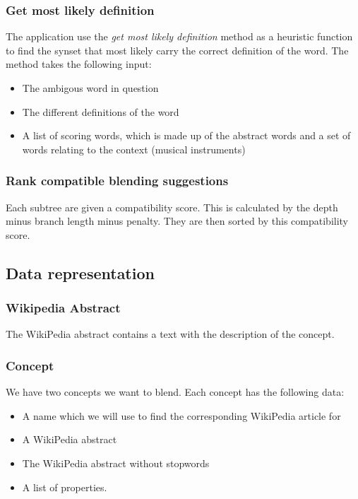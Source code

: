\subsubsection{Get most likely definition}
The application use the \emph{get most likely definition} method as a heuristic function to find the synset that most likely carry the correct definition of the word. The method takes the following input:
\begin{itemize}
	\item The ambigous word in question
	\item The different definitions of the word
	\item A list of scoring words, which is made up of the abstract words and a set of words relating to the context (musical instruments)
\end{itemize}

\subsubsection{Rank compatible blending suggestions}
Each subtree are given a compatibility score. This is calculated by the depth minus branch length minus penalty. They are then sorted by this compatibility score.

\subsection{Data representation}

\subsubsection{Wikipedia Abstract}
The WikiPedia abstract contains a text with the description of the concept.

\subsubsection{Concept}
We have two concepts we want to blend. Each concept has the following data:
\begin{itemize}
\item A name which we will use to find the corresponding WikiPedia article for
\item A WikiPedia abstract
\item The WikiPedia abstract without stopwords
\item A list of properties.
\end{itemize}

